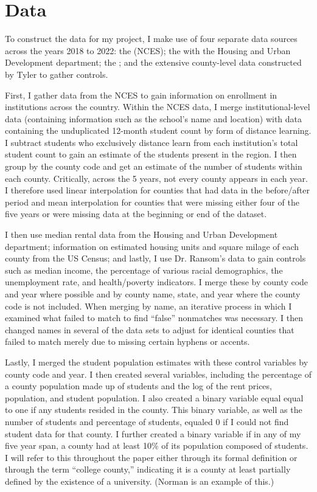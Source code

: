 \documentclass[12pt,english]{article}
\begin{document}
\section{Data}\label{sec:data}
To construct the data for my project, I make use of four separate data sources across the years 2018 to 2022: the \citet{nces} (NCES); the \citet{hud} with the Housing and Urban Development department; the \citet{uscensus2}; and the extensive county-level data constructed by Tyler \citet{professor} to gather controls. 

First, I gather data from the NCES to gain information on enrollment in institutions across the country. Within the NCES data, I merge institutional-level data (containing information such as the school's name and location) with data containing the unduplicated 12-month student count by form of distance learning. I subtract students who exclusively distance learn from each institution’s total student count to gain an estimate of the students present in the region. I then group by the county code and get an estimate of the number of students within each county. Critically, across the 5 years, not every county appears in each year. I therefore used linear interpolation for counties that had data in the before/after period and mean interpolation for counties that were missing either four of the five years or were missing data at the beginning or end of the dataset.

I then use median rental data from the Housing and Urban Development department; information on estimated housing units and square milage of each county from the US Census; and lastly, I use Dr. Ransom's data to gain controls such as median income, the percentage of various racial demographics, the unemployment rate, and health/poverty indicators. I merge these by county code and year where possible and by county name, state, and year where the county code is not included. When merging by name, an iterative process in which I examined what failed to match to find ``false'' nonmatches was necessary. I then changed names in several of the data sets to adjust for identical counties that failed to match merely due to missing certain hyphens or accents.

Lastly, I merged the student population estimates with these control variables by county code and year. I then created several variables, including the percentage of a county population made up of students and the log of the rent prices, population, and student population. I also created a binary variable equal  equal to one if any students resided in the county. This binary variable, as well as the number of students and percentage of students, equaled 0 if I could not find student data for that county. I further created a binary variable if in any of my five year span, a county had at least 10\% of its population composed of students. I will refer to this throughout the paper either through its formal definition or through the term ``college county,'' indicating it is a county at least partially defined by the existence of a university. (Norman is an example of this.)
\end{document}
